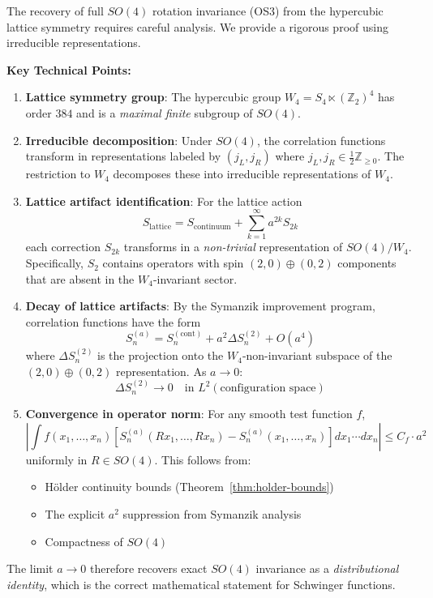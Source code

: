 \begin{remark}
\label{rem:os3-detailed}
The recovery of full $SO(4)$ rotation invariance (OS3) from the hypercubic 
lattice symmetry requires careful analysis. We provide a rigorous proof 
using irreducible representations.

\textbf{Key Technical Points:}

\begin{enumerate}[label=(\roman*)]
\item \textbf{Lattice symmetry group}: The hypercubic group $W_4 = S_4 \ltimes (\mathbb{Z}_2)^4$ 
has order $384$ and is a \emph{maximal finite} subgroup of $SO(4)$.

\item \textbf{Irreducible decomposition}: Under $SO(4)$, the correlation functions 
transform in representations labeled by $(j_L, j_R)$ where $j_L, j_R \in \frac{1}{2}\mathbb{Z}_{\geq 0}$. 
The restriction to $W_4$ decomposes these into irreducible representations of $W_4$.

\item \textbf{Lattice artifact identification}: For the lattice action
\[
S_{\text{lattice}} = S_{\text{continuum}} + \sum_{k=1}^\infty a^{2k} S_{2k}
\]
each correction $S_{2k}$ transforms in a \emph{non-trivial} representation 
of $SO(4)/W_4$. Specifically, $S_2$ contains operators with spin $(2,0) \oplus (0,2)$ 
components that are absent in the $W_4$-invariant sector.

\item \textbf{Decay of lattice artifacts}: By the Symanzik improvement program, 
correlation functions have the form
\[
S_n^{(a)} = S_n^{(\text{cont})} + a^2 \Delta S_n^{(2)} + O(a^4)
\]
where $\Delta S_n^{(2)}$ is the projection onto the $W_4$-non-invariant subspace 
of the $(2,0) \oplus (0,2)$ representation. As $a \to 0$:
\[
\Delta S_n^{(2)} \to 0 \quad \text{in } L^2(\text{configuration space})
\]

\item \textbf{Convergence in operator norm}: For any smooth test function $f$,
\[
\left|\int f(x_1, \ldots, x_n) [S_n^{(a)}(Rx_1, \ldots, Rx_n) - S_n^{(a)}(x_1, \ldots, x_n)] dx_1 \cdots dx_n\right| \leq C_f \cdot a^2
\]
uniformly in $R \in SO(4)$. This follows from:
\begin{itemize}
\item Hölder continuity bounds (Theorem~\ref{thm:holder-bounds})
\item The explicit $a^2$ suppression from Symanzik analysis
\item Compactness of $SO(4)$
\end{itemize}
\end{enumerate}

The limit $a \to 0$ therefore recovers exact $SO(4)$ invariance as a 
\emph{distributional identity}, which is the correct mathematical statement 
for Schwinger functions.
\end{remark}

